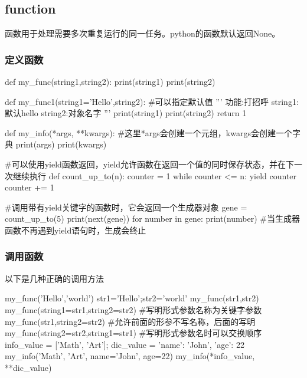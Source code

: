   \subsection{function}
    函数用于处理需要多次重复运行的同一任务。python的函数默认返回None。
    \subsubsection{定义函数}
      \begin{codeblock}[language=python, caption={definition of functions}]
        def my_func(string1,string2):
          print(string1)
          print(string2)

        def my_func1(string1='Hello',string2): #可以指定默认值
          ''' 功能:打招呼
              string1:默认hello
              string2:对象名字 '''
          print(string1)
          print(string2)
          return 1

        def my_info(*args, **kwargs): #这里*args会创建一个元组，kwargs会创建一个字典
          print(args)
          print(kwargs)

        #可以使用yield函数返回，yield允许函数在返回一个值的同时保存状态，并在下一次继续执行
        def count_up_to(n):
            counter = 1
            while counter <= n:
                yield counter
                counter += 1

        #调用带有yield关键字的函数时，它会返回一个生成器对象
        gene = count_up_to(5)
        print(next(gene))
        for number in gene:
            print(number)
        #当生成器函数不再遇到yield语句时，生成会终止
      \end{codeblock}

    \subsubsection{调用函数}
      以下是几种正确的调用方法
      \begin{codeblock}[language=python, caption={use of function}]
        my_func('Hello','world')
        str1='Hello';str2='world'
        my_func(str1,str2)
        my_func(string1=str1,string2=str2) #写明形式参数名称为关键字参数
        my_func(str1,string2=str2) #允许前面的形参不写名称，后面的写明
        my_func(string2=str2,string1=str1) #写明形式参数名时可以交换顺序
        info_value = ['Math', 'Art']; dic_value = {'name': 'John', 'age': 22}
        my_info('Math', 'Art', name='John', age=22)
        my_info(*info_value, **dic_value)
      \end{codeblock}


